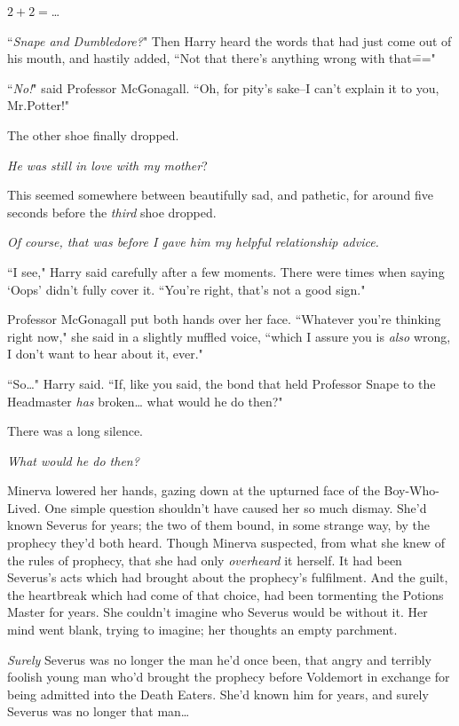 $2 + 2 = ${\ldots}

``\emph{Snape and Dumbledore?}" Then Harry heard the words that had just come out of his mouth, and hastily added, ``Not that there's anything wrong with that\==="

``\emph{No!}" said Professor McGonagall. ``Oh, for pity's sake\---I can't explain it to you, Mr.\?Potter!"

The other shoe finally dropped.

\emph{He was \emph{still} in love with my mother}?

This seemed somewhere between beautifully sad, and pathetic, for around five seconds before the \emph{third} shoe dropped.

\emph{Of course, that was before I gave him my helpful relationship advice.}

``I see," Harry said carefully after a few moments. There were times when saying `Oops' didn't fully cover it. ``You're right, that's not a good sign."

Professor McGonagall put both hands over her face. ``Whatever you're thinking right now," she said in a slightly muffled voice, ``which I assure you is \emph{also} wrong, I don't want to hear about it, ever."

``So{\ldots}" Harry said. ``If, like you said, the bond that held Professor Snape to the Headmaster \emph{has} broken{\ldots} what would he do then?"

There was a long silence.

\later

\emph{What would he do then?}

Minerva lowered her hands, gazing down at the upturned face of the Boy-Who-Lived. One simple question shouldn't have caused her so much dismay. She'd known Severus for years; the two of them bound, in some strange way, by the prophecy they'd both heard. Though Minerva suspected, from what she knew of the rules of prophecy, that she had only \emph{overheard} it herself. It had been Severus's acts which had brought about the prophecy's fulfilment. And the guilt, the heartbreak which had come of that choice, had been tormenting the Potions Master for years. She couldn't imagine who Severus would be without it. Her mind went blank, trying to imagine; her thoughts an empty parchment.

\emph{Surely} Severus was no longer the man he'd once been, that angry and terribly foolish young man who'd brought the prophecy before Voldemort in exchange for being admitted into the Death Eaters. She'd known him for years, and surely Severus was no longer that man{\ldots}

